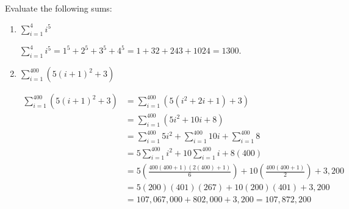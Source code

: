 \documentclass[ nooutcomes]{ximera}
\begin{document}
\begin{problem}
  Evaluate the following sums:
  \begin{enumerate}
  \item $\sum_{i=1}^{4} i^5 $
    \begin{freeResponse}
      $\sum_{i=1}^{4} i^5 = 1^5 + 2^5 + 3^5 + 4^5 = 1 + 32 + 243 +
      1024 = 1300$.
    \end{freeResponse}

  \item $\sum_{i=1}^{400} (5(i+1)^2 + 3) $
    \begin{freeResponse}
      \begin{align*}
        \sum_{i=1}^{400} (5(i+1)^2 + 3) 
        &= \sum_{i=1}^{400} (5(i^2 + 2i + 1) + 3) \\
        &= \sum_{i=1}^{400} (5i^2 + 10i + 8) \\
        &= \sum_{i=1}^{400} 5i^2 + \sum_{i=1}^{400} 10i + \sum_{i=1}^{400} 8  \\
        &= 5\sum_{i=1}^{400} i^2 + 10 \sum_{i=1}^{400} i + 8(400)  \\
        &= 5 \left( \frac{400(400+1)(2(400) + 1)}{6} \right) + 10 \left( \frac{400(400+1)}{2} \right) + 3,200  \\
        &= 5 (200)(401)(267) + 10(200)(401) + 3,200  \\
        &= 107,067,000 + 802,000 + 3,200 = 107,872,200
      \end{align*}
    \end{freeResponse}
  \end{enumerate}
\end{problem}
\end{document}

